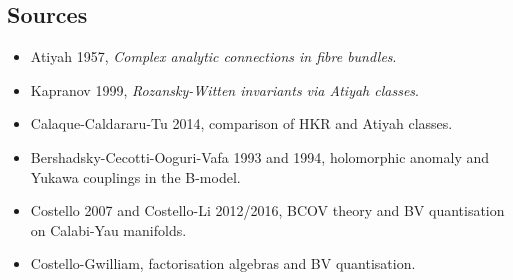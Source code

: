 \subsection*{Sources}
\label{subsec:bcov-yukawa-sources}

\begin{itemize}
\item Atiyah 1957, \emph{Complex analytic connections in fibre bundles}.
\item Kapranov 1999, \emph{Rozansky-Witten invariants via Atiyah classes}.
\item Calaque-Caldararu-Tu 2014, comparison of HKR and Atiyah classes.
\item Bershadsky-Cecotti-Ooguri-Vafa 1993 and 1994, holomorphic anomaly
and Yukawa couplings in the B-model.
\item Costello 2007 and Costello-Li 2012/2016, BCOV theory and BV
quantisation on Calabi-Yau manifolds.
\item Costello-Gwilliam, factorisation algebras and BV quantisation.
\end{itemize}
